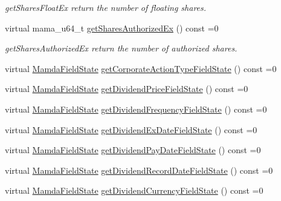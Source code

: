 \begin{CompactItemize}
\begin{CompactList}\small\item\em get\-Shares\-Float\-Ex return the number of floating shares. \item\end{CompactList}\item 
virtual mama\_\-u64\_\-t \hyperlink{classWombat_1_1MamdaFundamentals_20aba7aa488e92f4ef85e763ca9264a7}{get\-Shares\-Authorized\-Ex} () const =0
\begin{CompactList}\small\item\em get\-Shares\-Authorized\-Ex return the number of authorized shares. \item\end{CompactList}\item 
virtual \hyperlink{namespaceWombat_93aac974f2ab713554fd12a1fa3b7d2a}{Mamda\-Field\-State} \hyperlink{classWombat_1_1MamdaFundamentals_73d57275845df72b4c389c7081e7170d}{get\-Corporate\-Action\-Type\-Field\-State} () const =0
\item 
virtual \hyperlink{namespaceWombat_93aac974f2ab713554fd12a1fa3b7d2a}{Mamda\-Field\-State} \hyperlink{classWombat_1_1MamdaFundamentals_adfde192656e67be8ce319914e87b29a}{get\-Dividend\-Price\-Field\-State} () const =0
\item 
virtual \hyperlink{namespaceWombat_93aac974f2ab713554fd12a1fa3b7d2a}{Mamda\-Field\-State} \hyperlink{classWombat_1_1MamdaFundamentals_13fb32e1e1b2be497a45b01acee43935}{get\-Dividend\-Frequency\-Field\-State} () const =0
\item 
virtual \hyperlink{namespaceWombat_93aac974f2ab713554fd12a1fa3b7d2a}{Mamda\-Field\-State} \hyperlink{classWombat_1_1MamdaFundamentals_f5f8ae5bbc476f93bc9223d1ae80ca0b}{get\-Dividend\-Ex\-Date\-Field\-State} () const =0
\item 
virtual \hyperlink{namespaceWombat_93aac974f2ab713554fd12a1fa3b7d2a}{Mamda\-Field\-State} \hyperlink{classWombat_1_1MamdaFundamentals_29de98f5c24812d90fb5efb76f0293e0}{get\-Dividend\-Pay\-Date\-Field\-State} () const =0
\item 
virtual \hyperlink{namespaceWombat_93aac974f2ab713554fd12a1fa3b7d2a}{Mamda\-Field\-State} \hyperlink{classWombat_1_1MamdaFundamentals_d08e80fd98352ba7eaa5beafaaad9d55}{get\-Dividend\-Record\-Date\-Field\-State} () const =0
\item 
virtual \hyperlink{namespaceWombat_93aac974f2ab713554fd12a1fa3b7d2a}{Mamda\-Field\-State} \hyperlink{classWombat_1_1MamdaFundamentals_a4d435932821fbb0f1e9eb9da90c47cc}{get\-Dividend\-Currency\-Field\-State} () const =0

\end{CompactItemize}
